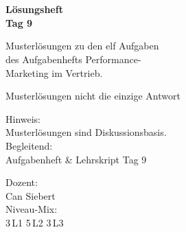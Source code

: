 \documentclass[11pt,a4paper,oneside]{article}
\begin{document}
\begin{titlepage}
  \pagestyle{empty}
  \vspace*{1.5cm}
  \\[2pt]
  \noindent{\color{lpAccent}\rule{\linewidth}{1.2pt}}\\[4pt]

  \vspace{3cm}
  {\sffamily\fontsize{30}{34}\selectfont\bfseries\color{lpInk}Lösungsheft\\Tag 9\par}

  \vspace{0.7cm}
  {\sffamily\large\color{lpGray}Musterlösungen zu den elf Aufgaben\\des Aufgabenhefts \textendash{} Performance-\\Marketing im Vertrieb.\par}

  \vspace{1.5cm}
  {\caveatfont\LARGE\color{lpGreen}Musterlösungen \textperiodcentered{} nicht die einzige Antwort}\par

  \vfill

  \noindent\begin{minipage}{0.55\linewidth}
    {\sffamily\footnotesize\color{lpGray}Hinweis:}\\
    {\sffamily\small\color{lpInk}Musterlösungen sind Diskussionsbasis.}\\[10pt]
    {\sffamily\footnotesize\color{lpGray}Begleitend:}\\
    {\sffamily\small\color{lpInk}Aufgabenheft \& Lehrskript Tag 9}
  \end{minipage}\hfill
  \begin{minipage}{0.4\linewidth}
    \raggedleft
    {\sffamily\footnotesize\color{lpGray}Dozent:}\\
    {\sffamily\small\color{lpInk}Can Siebert}\\[10pt]
    {\sffamily\footnotesize\color{lpGray}Niveau-Mix:}\\
    {\sffamily\small\color{lpInk}3\,L1 \textperiodcentered{} 5\,L2 \textperiodcentered{} 3\,L3}
  \end{minipage}

  \vspace{0.5cm}
  \noindent{\color{lpAccent}\rule{\linewidth}{0.6pt}}
\end{titlepage}
\end{document}
